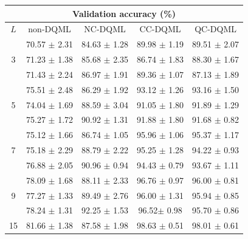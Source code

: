 \documentclass[aps,prx,reprint,amsmath,amssymb,superscriptaddress,nobibnotes,showpacs]{revtex4-2}
\begin{document}
\begin{table}[t!]
\centering
\begin{tabular}{      c||c|c|c|c  }

 \hline

 \multicolumn{5}{c}{Validation accuracy (\%)} \\
 \hline
 \multirow{2}{*}{$L$}  &   \multirow{2}{*}{non-DQML}   & \multirow{2}{*}{NC-DQML}  & \multirow{2}{*}{CC-DQML} & \multirow{2}{*}{QC-DQML}\\
 &&&&\\

 
 \hline

 \multirow{3}{*}{3} &  70.57 $\pm$ 2.31  & 84.63 $\pm$ 1.28   & 89.98 $\pm$ 1.19 & 89.51 $\pm$ 2.07 \\[1pt]
 & 71.23 $\pm$ 1.38 & 85.68 $\pm$ 2.35 & 86.74 $\pm$ 1.83 & 88.30 $\pm$ 1.67\\[1pt]
 &  71.43 $\pm$ 2.24  & 86.97 $\pm$ 1.91   & 89.36 $\pm$ 1.07 & 87.13 $\pm$ 1.89\\

 \hline
 \multirow{3}{*}{5}  &75.51 $\pm$ 2.48 & 86.29 $\pm$ 1.92 & 93.12 $\pm$ 1.26 & 93.16 $\pm$ 1.50\\[1pt]
 &74.04 $\pm$ 1.69 &88.59 $\pm$ 3.04 &91.05 $\pm$ 1.80 &91.89 $\pm$ 1.29\\[1pt]

 &75.27 $\pm$ 1.72 & 90.92 $\pm$ 1.31 & 91.88 $\pm$ 1.80 & 91.68 $\pm$ 0.82\\
 

\hline

 \multirow{3}{*}{7}
 & 75.12 $\pm$ 1.66 & 86.74 $\pm$ 1.05 & 95.96 $\pm$ 1.06 & 95.37 $\pm$ 1.17\\[1pt]
 &75.18 $\pm$ 2.29 & 88.79 $\pm$ 2.22 & 95.25 $\pm$ 1.28 & 94.22 $\pm$ 0.93\\[1pt]
& 76.88 $\pm$ 2.05 & 90.96 $\pm$ 0.94 & 94.43 $\pm$ 0.79 & 93.67 $\pm$ 1.11\\

 \hline
 \multirow{3}{*}{9}&78.09 $\pm$ 1.68 &88.11 $\pm$ 2.33 &96.76 $\pm$ 0.97 &96.00 $\pm$ 0.81\\[1pt]
 & 77.27 $\pm$ 1.33 & 89.49 $\pm$ 2.76 & 96.00 $\pm$ 1.31 & 95.94 $\pm$ 0.85\\[1pt]
&78.24 $\pm$ 1.31 &92.25 $\pm$ 1.53&96.52$\pm$ 0.98&95.70 $\pm$ 0.86\\
\hline

15 &81.66 $\pm$ 1.38 &87.58 $\pm$ 1.98 &98.63 $\pm$ 0.51 &98.01 $\pm$ 0.61\\[1pt]


\end{tabular}
\end{table}
\end{document}

